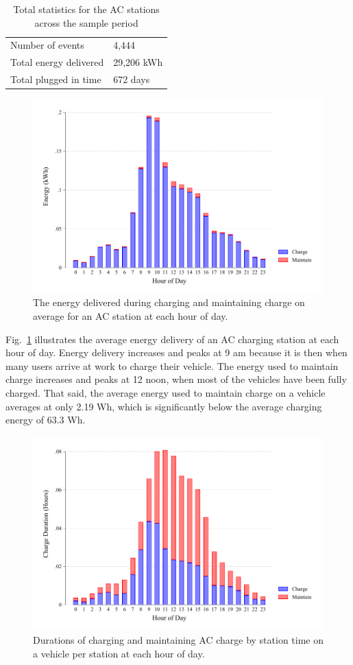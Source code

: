 \begin{table}[H]
	\centering
	\caption{Total statistics for the AC stations across the sample period}
	\label{tbl:10:acstats}
	\begin{tabular}{ll}
		\toprule
		Number of events & 4,444 \\
		Total energy delivered & 29,206 kWh \\
		Total plugged in time & 672 days \\
		\bottomrule
	\end{tabular}
\end{table}

\begin{figure}[H]
	\centering
	\includegraphics[width=0.8\linewidth]{ac_h_e}
	\caption[Energy delivered for an AC station at each hour of day]{The energy delivered during charging and maintaining charge on average for an AC station at each hour of day.}
	\label{fig:10:ac_h_e}
\end{figure}

Fig.~\ref{fig:10:ac_h_e} illustrates the average energy delivery of an AC charging station at each hour of day. Energy delivery increases and peaks at 9 am because it is then when many users arrive at work to charge their vehicle. The energy used to maintain charge increases and peaks at 12 noon, when most of the vehicles have been fully charged. That said, the average energy used to maintain charge on a vehicle averages at only 2.19 Wh, which is significantly below the average charging energy of 63.3 Wh.

\begin{figure}[H]
	\centering
	\includegraphics[width=0.8\linewidth]{ac_h_c}
	\caption[Durations of AC charge per station at each hour of day]{Durations of charging and maintaining AC charge by station time on a vehicle per station at each hour of day.}
	\label{fig:10:ac_h_c}
\end{figure}


